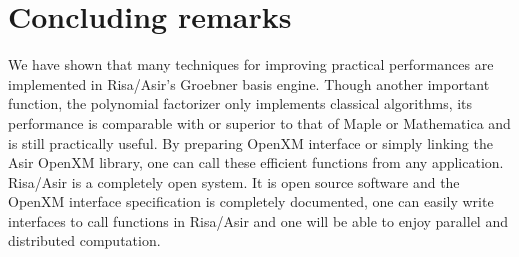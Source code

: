 \documentclass[runningheads]{cl2emult}
\begin{document}
\section{Concluding remarks}
%
We have shown that many techniques for
improving practical performances are implemented in Risa/Asir's
Groebner basis engine.  Though another important function, the
polynomial factorizer only implements classical algorithms, its
performance is comparable with or superior to that of Maple or
Mathematica and is still practically useful.  By preparing OpenXM
interface or simply linking the Asir OpenXM library, one can call
these efficient functions from any application.  Risa/Asir is a
completely open system.  It is open source software
and the OpenXM interface specification is completely documented, one
can easily write interfaces to call functions in Risa/Asir and one
will be able to enjoy parallel and distributed computation.
\end{document}
